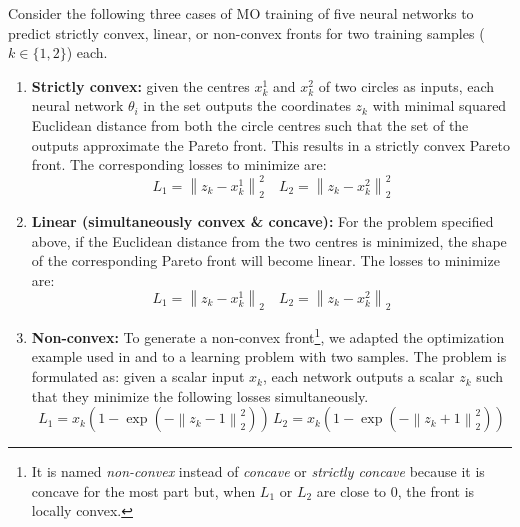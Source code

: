 Consider the following three cases of MO training of five neural networks to predict strictly convex, linear, or non-convex fronts for two training samples ($k \in \{1, 2\} $) each.
\begin{enumerate}

\item \textbf{Strictly convex:} given the centres $x_{k}^{1}$ and $x_{k}^{2}$ of two circles as inputs, each neural network $\theta_{i}$ in the set outputs the coordinates $z_{k}$ %
with minimal squared Euclidean distance from both the circle centres such that the set of the outputs approximate the Pareto front. This results in a strictly convex Pareto front. The corresponding losses to minimize are:
\begin{equation*}
    L_{1} = \left\lVert z_{k} - x_{k}^{1} \right\rVert_{2}^{2}  \quad L_{2} = \left\lVert z_{k} - x_{k}^{2}\right\rVert_{2}^{2}
\end{equation*}
\item \textbf{Linear (simultaneously convex \& concave):} For the problem specified above, if the Euclidean distance from the two centres is minimized, the shape of the corresponding Pareto front will become linear. The losses to minimize are:
\begin{equation*}
    L_{1} = \left\lVert z_{k} - x_{k}^{1} \right\rVert_{2}  \quad L_{2} = \left\lVert z_{k} - x_{k}^{2}\right\rVert_{2}
\end{equation*}
\item \textbf{Non-convex:} To generate a non-convex front\footnote{It is named \emph{non-convex} instead of \emph{concave} or \emph{strictly concave} because it is concave for the most part but, when $L_{1}$ or $L_{2}$ are close to 0, the front is locally convex.}, we adapted the optimization example used in  \cite{lin2019paretomtl} and \cite{mahapatra2020multi} to a learning problem with two samples. The problem is formulated as: given a scalar input $x_{k}$, each network outputs a scalar $z_{k}$ %
such that they minimize the following losses simultaneously. 
\begin{equation*}
    L_{1} = x_{k} \left(1- \exp{\left(-\left\lVert z_{k}-1\right\rVert_{2}^{2}\right)} \right)  \, L_{2} = x_{k} \left(1- \exp{\left(-\left\lVert z_{k}+1\right\rVert_{2}^{2}\right)} \right)
\end{equation*}

\end{enumerate}

